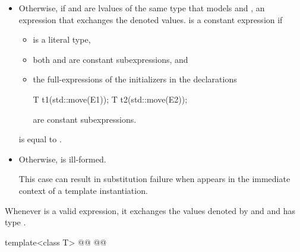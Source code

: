 \begin{addedblock}
\begin{itemize}
\item
  Otherwise, if  and  are lvalues of the
  same type  that models  and
  , an expression that exchanges the denoted values.
   is a constant expression if
  \begin{itemize}
  \item {} is a literal type,
  \item both  and  are
    constant subexpressions, and
  \item the full-expressions of the initializers in the declarations
    \begin{codeblock}
    T t1(std::move(E1));
    T t2(std::move(E2));
    \end{codeblock}
    are constant subexpressions.
  \end{itemize}
   is equal to
  .

\item
  Otherwise,  is ill-formed.
  \begin{note}
  This case can result in substitution failure when 
  appears in the immediate context of a template instantiation.
  \end{note}
\end{itemize}

\pnum
\begin{note}
Whenever  is a valid expression, it
exchanges the values denoted by
 and  and has type .
\end{note}
\end{addedblock}

%
\begin{itemdecl}
template<class T>
  @@
  @@
\end{itemdecl}


